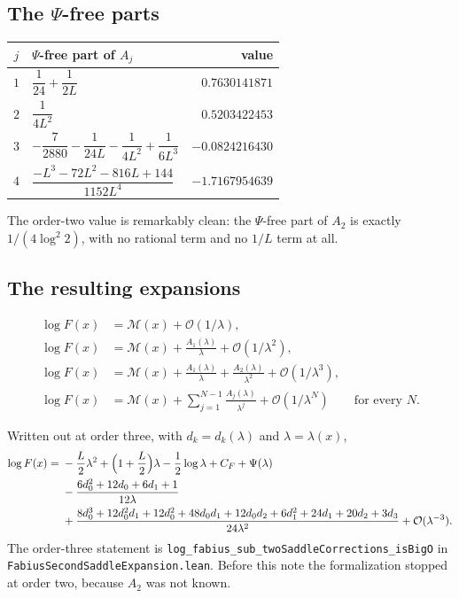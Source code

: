 \documentclass[11pt,oneside]{article}
\theoremstyle{definition}
\theoremstyle{remark}
\newcommand{\bigO}{\mathcal O}
\begin{document}
\subsection{The \texorpdfstring{$\Psi$}{Psi}-free parts}

\begin{center}
\begin{tabular}{@{}clr@{}}
\toprule
$j$ & $\Psi$-free part of $A_j$ & value\\
\midrule
$1$ & $\dfrac1{24}+\dfrac1{2L}$ & $0.7630141871$\\[0.6em]
$2$ & $\dfrac1{4L^2}$ & $0.5203422453$\\[0.6em]
$3$ & $-\dfrac7{2880}-\dfrac1{24L}-\dfrac1{4L^2}+\dfrac1{6L^3}$ & $-0.0824216430$\\
$4$ & $\dfrac{-L^3-72L^2-816L+144}{1152L^4}$ & $-1.7167954639$\\
\bottomrule
\end{tabular}
\end{center}

The order-two value is remarkably clean: the $\Psi$-free part of $A_2$ is
exactly $1/(4\log^2 2)$, with no rational term and no $1/L$ term at all.

\subsection{The resulting expansions}

\[
\begin{aligned}
  \log F(x)&=\mathcal M(x)+\bigO(1/\lambda),\\
  \log F(x)&=\mathcal M(x)+\frac{A_1(\lambda)}{\lambda}+\bigO(1/\lambda^2),\\
  \log F(x)&=\mathcal M(x)+\frac{A_1(\lambda)}{\lambda}
    +\frac{A_2(\lambda)}{\lambda^2}+\bigO(1/\lambda^3),\\
  \log F(x)&=\mathcal M(x)+\sum_{j=1}^{N-1}\frac{A_j(\lambda)}{\lambda^j}
    +\bigO(1/\lambda^N)\qquad\text{for every }N.
\end{aligned}
\]

Written out at order three, with $d_k=d_k(\lambda)$ and $\lambda=\lambda(x)$,
\[
\begin{aligned}
  \log F(x)={}&-\frac L2\lambda^2+\Bigl(1+\frac L2\Bigr)\lambda
    -\frac12\log\lambda+C_F+\Psi(\lambda)\\
   &-\frac{6d_0^2+12d_0+6d_1+1}{12\lambda}\\
   &+\frac{8d_0^3+12d_0^2d_1+12d_0^2+48d_0d_1+12d_0d_2
      +6d_1^2+24d_1+20d_2+3d_3}{24\lambda^2}
    +\bigO(\lambda^{-3}).
\end{aligned}
\]
The order-three statement is
\texttt{log\_fabius\_sub\_twoSaddleCorrections\_isBigO} in
\nolinkurl{FabiusSecondSaddleExpansion.lean}.  Before this note the
formalization stopped at order two, because $A_2$ was not known.
\end{document}
